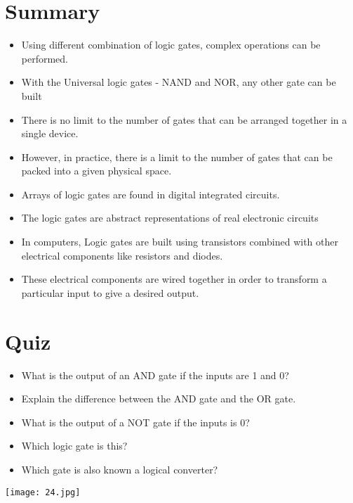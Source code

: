 \documentclass[10pt,a4paper,onecolumn]{article}
\begin{document}
\section{Summary}
\begin{itemize}
	\item Using different combination of logic gates, complex operations can be performed. 
	\item With the Universal logic gates - NAND and NOR, any other gate can be built
	\item There is no limit to the number of gates that can be arranged together in a single device. 
	\item However, in practice, there is a limit to the number of gates that can be packed into a given physical space. 
	\item Arrays of logic gates are found in digital integrated circuits.
	\item The logic gates are abstract representations of real electronic circuits
	\item In computers, Logic gates are built using transistors combined with other electrical components like resistors and diodes. 
	\item These electrical components are wired together in order to transform a particular input to give a desired output. \cite{mygst108}
\end{itemize}

\section{Quiz}
\begin{itemize}
	\item What is the output of an AND gate if the inputs are 1 and 0?
	\item Explain the difference between the AND gate and the OR gate.
	\item What is the output of a NOT gate if the inputs is 0?
	\item Which logic gate is this?
	\item Which gate is also known 
	a logical converter?
\end{itemize}

\texttt{[image: 24.jpg]}

\newpage


\end{document}
